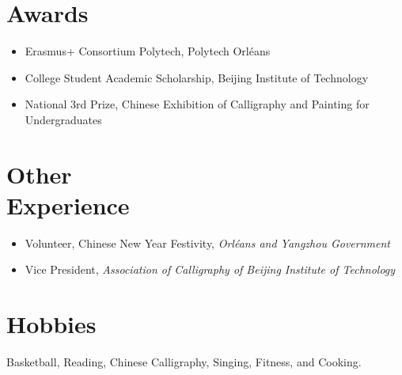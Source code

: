\documentclass{mycv}
\begin{document}
\vspace{-\parskip}

\section{Awards}

\begin{itemize}
  \itemsep 0em
  \item Erasmus+ Consortium Polytech, Polytech Orléans 
  \item College Student Academic Scholarship, Beijing Institute of Technology 
  \item National 3rd Prize, Chinese Exhibition of Calligraphy and Painting for Undergraduates 
\end{itemize}

\vspace{-\parskip}

\section{Other \\ Experience}
\begin{itemize}
  \itemsep 0em
  \item  Volunteer, Chinese New Year Festivity, \emph{Orl\'eans and Yangzhou Government} 
  \item Vice President, \emph{Association of Calligraphy of Beijing Institute of Technology} 
\end{itemize}

\vspace{-\parskip}

\section{Hobbies}
Basketball, Reading, Chinese Calligraphy, Singing, Fitness, and Cooking.

\end{document}
